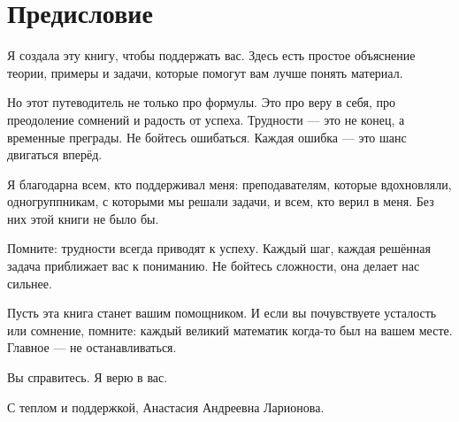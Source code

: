 \documentclass[../Main.tex]{subfiles}
\begin{document}
\chapter*{Предисловие}
Я создала эту книгу, чтобы поддержать вас. Здесь есть простое объяснение теории, примеры и задачи, которые помогут вам лучше понять материал.

Но этот путеводитель не только про формулы. Это про веру в себя, про преодоление сомнений и радость от успеха. Трудности — это не конец, а временные преграды. Не бойтесь ошибаться. Каждая ошибка — это шанс двигаться вперёд.

Я благодарна всем, кто поддерживал меня: преподавателям, которые вдохновляли, одногруппникам, с которыми мы решали задачи, и всем, кто верил в меня. Без них этой книги не было бы.

Помните: трудности всегда приводят к успеху. Каждый шаг, каждая решённая задача приближает вас к пониманию. Не бойтесь сложности, она делает нас сильнее.

Пусть эта книга станет вашим помощником. И если вы почувствуете усталость или сомнение, помните: каждый великий математик когда-то был на вашем месте. Главное — не останавливаться.

Вы справитесь. Я верю в вас.

С теплом и поддержкой, Анастасия Андреевна Ларионова.
\end{document}
